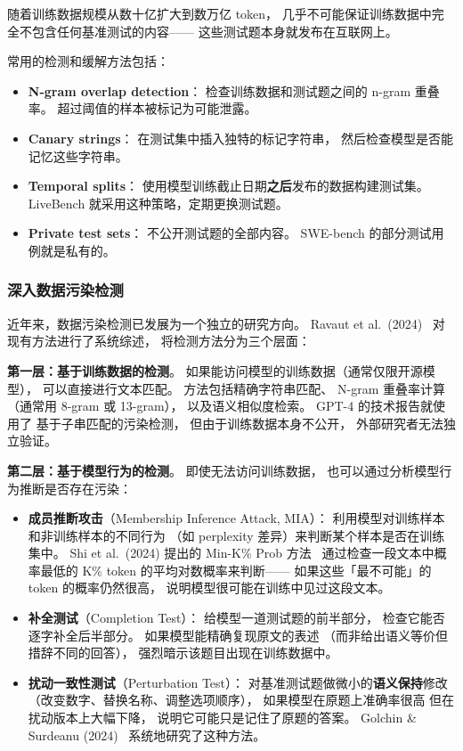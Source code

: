 随着训练数据规模从数十亿扩大到数万亿 token，
几乎不可能保证训练数据中完全不包含任何基准测试的内容——
这些测试题本身就发布在互联网上。

常用的检测和缓解方法包括：
\begin{itemize}[noitemsep]
  \item \textbf{N-gram overlap detection}：
        检查训练数据和测试题之间的 n-gram 重叠率。
        超过阈值的样本被标记为可能泄露。
  \item \textbf{Canary strings}：
        在测试集中插入独特的标记字符串，
        然后检查模型是否能记忆这些字符串。
  \item \textbf{Temporal splits}：
        使用模型训练截止日期\textbf{之后}发布的数据构建测试集。
        LiveBench 就采用这种策略，定期更换测试题。
  \item \textbf{Private test sets}：
        不公开测试题的全部内容。
        SWE-bench 的部分测试用例就是私有的。
\end{itemize}

\subsubsection{深入数据污染检测}

近年来，数据污染检测已发展为一个独立的研究方向。
Ravaut et al.\ (2024)~\cite{ravaut2024contamination}
对现有方法进行了系统综述，
将检测方法分为三个层面：

\textbf{第一层：基于训练数据的检测}。
如果能访问模型的训练数据（通常仅限开源模型），
可以直接进行文本匹配。
方法包括精确字符串匹配、
N-gram 重叠率计算（通常用 8-gram 或 13-gram），
以及语义相似度检索。
GPT-4 的技术报告就使用了
基于子串匹配的污染检测，
但由于训练数据本身不公开，
外部研究者无法独立验证。

\textbf{第二层：基于模型行为的检测}。
即使无法访问训练数据，
也可以通过分析模型行为推断是否存在污染：
\begin{itemize}[noitemsep]
  \item \textbf{成员推断攻击}（Membership Inference Attack, MIA）：
        利用模型对训练样本和非训练样本的不同行为
        （如 perplexity 差异）来判断某个样本是否在训练集中。
        Shi et al.\ (2024) 提出的 Min-K\% Prob 方法~\cite{shi2024detecting}
        通过检查一段文本中概率最低的 K\% token
        的平均对数概率来判断——
        如果这些「最不可能」的 token 的概率仍然很高，
        说明模型很可能在训练中见过这段文本。
  \item \textbf{补全测试}（Completion Test）：
        给模型一道测试题的前半部分，
        检查它能否逐字补全后半部分。
        如果模型能精确复现原文的表述
        （而非给出语义等价但措辞不同的回答），
        强烈暗示该题目出现在训练数据中。
  \item \textbf{扰动一致性测试}（Perturbation Test）：
        对基准测试题做微小的\textbf{语义保持}修改
        （改变数字、替换名称、调整选项顺序），
        如果模型在原题上准确率很高
        但在扰动版本上大幅下降，
        说明它可能只是记住了原题的答案。
        Golchin \& Surdeanu (2024)~\cite{golchin2024time}
        系统地研究了这种方法。
\end{itemize}

